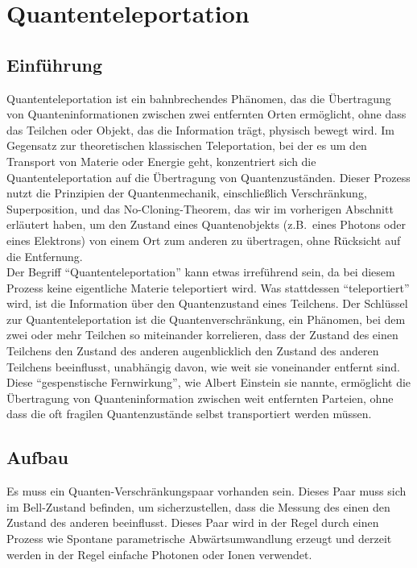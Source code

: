 \section{Quantenteleportation}\label{sec:quantum-teleportation}

\subsection{Einführung}\label{subsec:introduction}
Quantenteleportation ist ein bahnbrechendes Phänomen, das die Übertragung von Quanteninformationen
zwischen zwei entfernten Orten ermöglicht, ohne dass das Teilchen oder Objekt, das die Information trägt, physisch bewegt wird.
Im Gegensatz zur theoretischen klassischen Teleportation, bei der es um den Transport von Materie oder Energie geht,
konzentriert sich die Quantenteleportation auf die Übertragung von Quantenzuständen.
Dieser Prozess nutzt die Prinzipien der Quantenmechanik, einschließlich Verschränkung, Superposition,
und das No-Cloning-Theorem, das wir im vorherigen Abschnitt erläutert haben,
um den Zustand eines Quantenobjekts (z.B.\ eines Photons oder eines Elektrons) von einem Ort zum anderen zu übertragen,
ohne Rücksicht auf die Entfernung.\\

Der Begriff ``Quantenteleportation'' kann etwas irreführend sein, da bei diesem Prozess keine eigentliche Materie teleportiert wird.
Was stattdessen ``teleportiert'' wird, ist die Information über den Quantenzustand eines Teilchens.
Der Schlüssel zur Quantenteleportation ist die Quantenverschränkung,
ein Phänomen, bei dem zwei oder mehr Teilchen so miteinander korrelieren, dass der Zustand des einen Teilchens den Zustand des anderen augenblicklich
den Zustand des anderen Teilchens beeinflusst, unabhängig davon, wie weit sie voneinander entfernt sind.
Diese ``gespenstische Fernwirkung'', wie Albert Einstein sie nannte,
ermöglicht die Übertragung von Quanteninformation zwischen weit entfernten Parteien, ohne dass die oft fragilen Quantenzustände selbst transportiert werden müssen.

\subsection{Aufbau}\label{subsec:setup}

Es muss ein Quanten-Verschränkungspaar vorhanden sein.
Dieses Paar muss sich im Bell-Zustand\cite{quantuminfocambridge} befinden, um sicherzustellen, dass die Messung des einen den Zustand des anderen beeinflusst.
Dieses Paar wird in der Regel durch einen Prozess wie
Spontane parametrische Abwärtsumwandlung\cite{couteau2018spontaneous} erzeugt und derzeit
werden in der Regel einfache Photonen oder Ionen verwendet.\\


